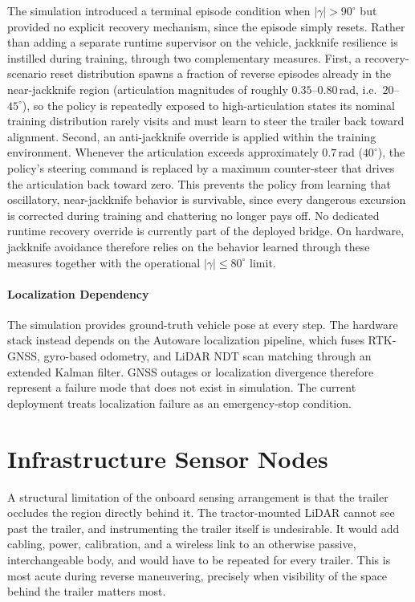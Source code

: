 The simulation introduced a terminal episode condition when $|\gamma| > 90^\circ$ but provided no explicit recovery mechanism, since the episode simply resets. Rather than adding a separate runtime supervisor on the vehicle, jackknife resilience is instilled during training, through two complementary measures. First, a recovery-scenario reset distribution spawns a fraction of reverse episodes already in the near-jackknife region (articulation magnitudes of roughly $0.35$--$0.80$\,rad, i.e.\ $20$--$45^\circ$), so the policy is repeatedly exposed to high-articulation states its nominal training distribution rarely visits and must learn to steer the trailer back toward alignment. Second, an anti-jackknife override is applied within the training environment. Whenever the articulation exceeds approximately $0.7$\,rad ($40^\circ$), the policy's steering command is replaced by a maximum counter-steer that drives the articulation back toward zero. This prevents the policy from learning that oscillatory, near-jackknife behavior is survivable, since every dangerous excursion is corrected during training and chattering no longer pays off. No dedicated runtime recovery override is currently part of the deployed bridge. On hardware, jackknife avoidance therefore relies on the behavior learned through these measures together with the operational $|\gamma| \le 80^\circ$ limit.

\paragraph{Localization Dependency}

The simulation provides ground-truth vehicle pose at every step. The hardware stack instead depends on the Autoware localization pipeline, which fuses RTK-GNSS, gyro-based odometry, and LiDAR NDT scan matching through an extended Kalman filter. GNSS outages or localization divergence therefore represent a failure mode that does not exist in simulation. The current deployment treats localization failure as an emergency-stop condition.

\section{Infrastructure Sensor Nodes}
\label{sec:sensor_nodes}

A structural limitation of the onboard sensing arrangement is that the trailer occludes the region directly behind it. The tractor-mounted LiDAR cannot see past the trailer, and instrumenting the trailer itself is undesirable. It would add cabling, power, calibration, and a wireless link to an otherwise passive, interchangeable body, and would have to be repeated for every trailer. This is most acute during reverse maneuvering, precisely when visibility of the space behind the trailer matters most.

